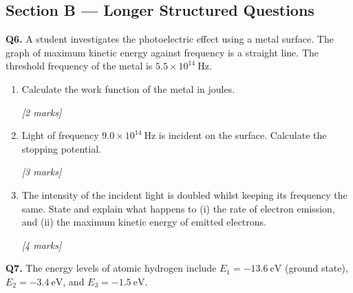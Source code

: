\subsection*{Section B — Longer Structured Questions}

\begin{tcolorbox}[colback=white, colframe=midblue, breakable]

\begin{minipage}{\linewidth}
\textbf{Q6.} A student investigates the photoelectric effect using a metal surface. The graph of maximum kinetic energy against frequency is a straight line. The threshold frequency of the metal is $5.5\times10^{14}\ \text{Hz}$.
\end{minipage}

\begin{enumerate}[label=(\alph*)]
  \item \begin{minipage}[t]{\linewidth}
  Calculate the work function of the metal in joules.
  \par\hfill\textit{[2 marks]}
  \vspace{3.0cm}
  \end{minipage}

  \item \begin{minipage}[t]{\linewidth}
  Light of frequency $9.0\times10^{14}\ \text{Hz}$ is incident on the surface. Calculate the stopping potential.
  \par\hfill\textit{[3 marks]}
  \vspace{3.5cm}
  \end{minipage}

  \item \begin{minipage}[t]{\linewidth}
  The intensity of the incident light is doubled whilst keeping its frequency the same. State and explain what happens to (i) the rate of electron emission, and (ii) the maximum kinetic energy of emitted electrons.
  \par\hfill\textit{[4 marks]}
  \vspace{4.0cm}
  \end{minipage}
\end{enumerate}

\begin{minipage}{\linewidth}
\textbf{Q7.} The energy levels of atomic hydrogen include $E_1 = -13.6\ \text{eV}$ (ground state), $E_2 = -3.4\ \text{eV}$, and $E_3 = -1.5\ \text{eV}$.
\end{minipage}


\end{tcolorbox}
